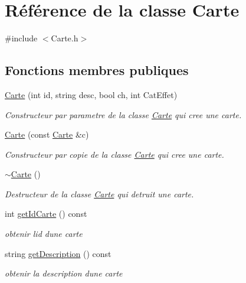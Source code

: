 \hypertarget{classCarte}{}\section{Référence de la classe Carte}
\label{classCarte}


{\ttfamily \#include $<$Carte.\+h$>$}

\subsection*{Fonctions membres publiques}
\begin{DoxyCompactItemize}
\item 
\hyperlink{classCarte_ae01a8e9e22e8c69efadac3ec3b9cd185}{Carte} (int id, string desc, bool ch, int Cat\+Effet)
\begin{DoxyCompactList}\small\item\em Constructeur par parametre de la classe \hyperlink{classCarte}{Carte} qui cree une carte. \end{DoxyCompactList}\item 
\hyperlink{classCarte_afe56c0ec89cb3cf0332755204b576a2d}{Carte} (const \hyperlink{classCarte}{Carte} \&c)
\begin{DoxyCompactList}\small\item\em Constructeur par copie de la classe \hyperlink{classCarte}{Carte} qui cree une carte. \end{DoxyCompactList}\item 
\hyperlink{classCarte_a63300ff55c58b5d5b1674a3fc8f25910}{$\sim$\+Carte} ()
\begin{DoxyCompactList}\small\item\em Destructeur de la classe \hyperlink{classCarte}{Carte} qui detruit une carte. \end{DoxyCompactList}\item 
int \hyperlink{classCarte_a04e3f529f748d73709a8bd55a4c5f4ca}{get\+Id\+Carte} () const 
\begin{DoxyCompactList}\small\item\em obtenir l\textquotesingle{}id d\textquotesingle{}une carte \end{DoxyCompactList}\item 
string \hyperlink{classCarte_a27c07b0be984dad02eea7350fc2b0c96}{get\+Description} () const 
\begin{DoxyCompactList}\small\item\em obtenir la description d\textquotesingle{}une carte \end{DoxyCompactList}\item 

\end{DoxyCompactItemize}
